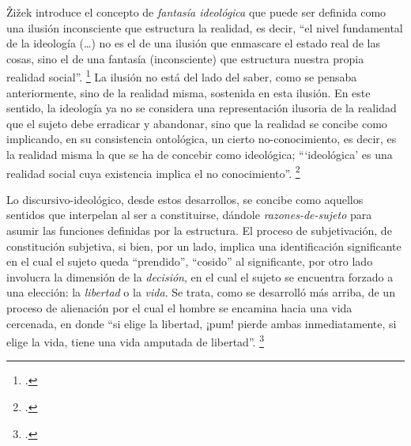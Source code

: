 Žižek introduce el concepto de \emph{fantasía ideológica} que puede ser definida como una ilusión inconsciente que estructura la realidad, es decir, \enquote{el nivel fundamental de la ideología (\ldots) no es el de una ilusión que enmascare el estado real de las cosas, sino el de una fantasía (inconsciente) que estructura nuestra propia realidad social}. \footcite[][46-47]{@7111-ZIZEK2003} La ilusión no está del lado del saber, como se pensaba anteriormente, sino de la realidad misma, sostenida en esta ilusión. En este sentido, la ideología ya no se considera una representación ilusoria de la realidad que el sujeto debe erradicar y abandonar, sino que la realidad se concibe como implicando, en su consistencia ontológica, un cierto no-conocimiento, es decir, es la realidad misma la que se ha de concebir como ideológica; \enquote{\enquote{ideológica} es una realidad social cuya existencia implica el no conocimiento}. \footcite[][118]{@7111-ZIZEK2003}

Lo discursivo-ideológico, desde estos desarrollos, se concibe como aquellos sentidos que interpelan al ser a constituirse, dándole \emph{razones-de-sujeto} para asumir las funciones definidas por la estructura. El proceso de subjetivación, de constitución subjetiva, si bien, por un lado, implica una identificación significante en el cual el sujeto queda \enquote{prendido}, \enquote{cosido} al significante, por otro lado involucra la dimensión de la \emph{decisión}, en el cual el sujeto se encuentra forzado a una elección: la \emph{libertad} o la \emph{vida}. Se trata, como se desarrolló más arriba, de un proceso de alienación por el cual el hombre se encamina hacia una vida cercenada, en donde \enquote{si elige la libertad, ¡pum! pierde ambas inmediatamente, si elige la vida, tiene una vida amputada de libertad}. \footcite[][220]{@7106-LACAN2006}

